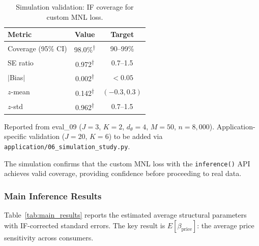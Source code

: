 \begin{table}[ht]
\centering
\caption{Simulation validation: IF coverage for custom MNL loss.}\label{tab:sim_results}
\begin{tabular}{lcc}
\toprule
\textbf{Metric} & \textbf{Value} & \textbf{Target} \\
\midrule
Coverage (95\% CI) & 98.0\%\textsuperscript{$\dagger$}  & 90--99\% \\
SE ratio            & 0.972\textsuperscript{$\dagger$}   & 0.7--1.5 \\
$|$Bias$|$          & 0.002\textsuperscript{$\dagger$}   & $< 0.05$ \\
$z$-mean            & 0.142\textsuperscript{$\dagger$}   & $(-0.3, 0.3)$ \\
$z$-std             & 0.962\textsuperscript{$\dagger$}   & 0.7--1.5 \\
\bottomrule
\end{tabular}
\begin{tablenotes}\small
\item[$\dagger$] Reported from eval\_09 ($J=3$, $K=2$, $d_\theta = 4$, $M=50$, $n=8{,}000$). Application-specific validation ($J=20$, $K=6$) to be added via \texttt{application/06\_simulation\_study.py}.
\end{tablenotes}
\end{table}

The simulation confirms that the custom MNL loss with the \texttt{inference()} API achieves valid coverage, providing confidence before proceeding to real data.

\subsubsection{Main Inference Results}

Table~\ref{tab:main_results} reports the estimated average structural parameters with IF-corrected standard errors. The key result is $E[\beta_{\text{price}}]$: the average price sensitivity across consumers.

